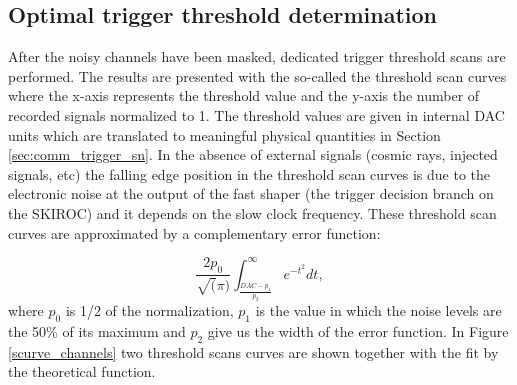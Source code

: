 \documentclass[a4paper,11pt]{article}
\begin{document}
\subsection{Optimal trigger threshold determination}
\label{sec:comm_trigger}

After the noisy channels have been masked, dedicated trigger threshold
scans are performed. The results are presented with the so-called the threshold scan curves where the
x-axis represents the threshold value and the y-axis
the number of recorded signals normalized to 1. The threshold values are given in internal DAC units
which are translated to meaningful physical quantities in Section \ref{sec:comm_trigger_sn}.
In the absence of external signals (cosmic rays, injected signals, etc) 
the falling edge position in the threshold scan curves
is due to the electronic noise
at the output of the fast shaper (the trigger decision branch on the SKIROC)
and it depends on the slow clock frequency.
These threshold scan curves are approximated by a complementary error function:

\begin{equation}
\frac{2p_{0}}{\sqrt(\pi)} \int_{\frac{DAC-p_{1}}{p_{2}}}^{\infty} e^{-t^{2}} dt,
\label{eq_S-curve}
\end{equation}
where $p_{0}$ is 1/2 of the normalization, $p_{1}$ is the value in which the noise levels are 
the 50\% of its maximum and $p_{2}$ give us the width of the error function. 
In Figure \ref{scurve_channels} 
two threshold scans curves are shown together with the fit by
the theoretical function.
\end{document}
